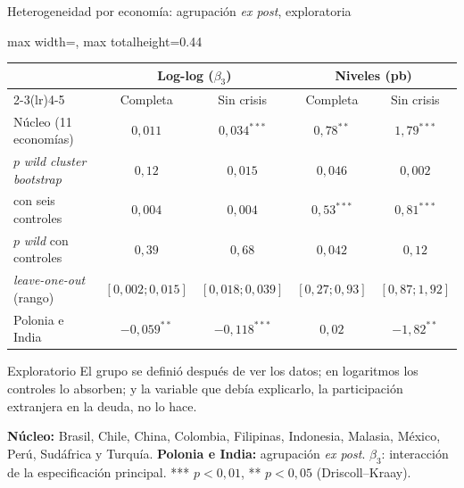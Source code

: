 \documentclass[aspectratio=169]{beamer}
\begin{document}
\begin{frame}{Heterogeneidad por economía: agrupación \textit{ex post}, exploratoria}
\centering
\footnotesize
\begin{adjustbox}{max width=\textwidth, max totalheight=0.44\textheight}
\begin{tabular}{l cc cc}
\toprule
 & \multicolumn{2}{c}{Log-log ($\beta_3$)} & \multicolumn{2}{c}{Niveles (pb)} \\
\cmidrule(lr){2-3}\cmidrule(lr){4-5}
 & Completa & Sin crisis & Completa & Sin crisis \\
\midrule
Núcleo (11 economías) & $0{,}011$ & $0{,}034^{***}$ & $0{,}78^{**}$ & $1{,}79^{***}$ \\
\quad $p$ \textit{wild cluster bootstrap} & $0{,}12$ & $0{,}015$ & $0{,}046$ & $0{,}002$ \\
\quad con seis controles & $0{,}004$ & $0{,}004$ & $0{,}53^{***}$ & $0{,}81^{***}$ \\
\quad $p$ \textit{wild} con controles & $0{,}39$ & $0{,}68$ & $0{,}042$ & $0{,}12$ \\
\quad \textit{leave-one-out} (rango) & $[0{,}002;0{,}015]$ & $[0{,}018;0{,}039]$ & $[0{,}27;0{,}93]$ & $[0{,}87;1{,}92]$ \\
\addlinespace
Polonia e India & $-0{,}059^{**}$ & $-0{,}118^{***}$ & $0{,}02$ & $-1{,}82^{**}$ \\
\bottomrule
\end{tabular}
\end{adjustbox}
\vspace{3pt}
\begin{alertblock}{Exploratorio}
\footnotesize El grupo se definió después de ver los datos; en logaritmos los controles lo absorben; y la variable que debía explicarlo, la participación extranjera en la deuda, no lo hace.
\end{alertblock}
\vspace{-2pt}
{\scriptsize\raggedright \textbf{Núcleo:} Brasil, Chile, China, Colombia, Filipinas, Indonesia, Malasia, México, Perú, Sudáfrica y Turquía. \textbf{Polonia e India:} agrupación \textit{ex post}. $\beta_3$: interacción de la especificación principal. *** $p<0{,}01$, ** $p<0{,}05$ (Driscoll--Kraay).\par}
\end{frame}
\end{document}
